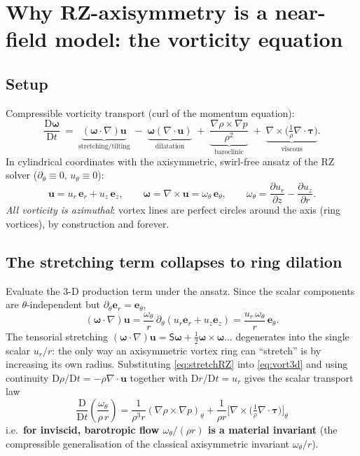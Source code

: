 \documentclass[11pt]{article}
\newcommand{\D}{\mathrm{D}}
\newcommand{\dd}{\partial}
\newcommand{\er}{\bm{e}_r}
\newcommand{\etheta}{\bm{e}_\theta}
\newcommand{\ez}{\bm{e}_z}
\newcommand{\om}{\bm{\omega}}
\newcommand{\ub}{\bm{u}}
\begin{document}
\section{Why RZ-axisymmetry is a near-field model: the vorticity equation}

\subsection{Setup}
Compressible vorticity transport (curl of the momentum equation):
\begin{equation}
  \frac{\D\om}{\D t}
  \;=\;
  \underbrace{(\om\!\cdot\!\nabla)\ub}_{\text{stretching/tilting}}
  \;-\;
  \underbrace{\om(\nabla\!\cdot\!\ub)}_{\text{dilatation}}
  \;+\;
  \underbrace{\frac{\nabla\rho\times\nabla p}{\rho^{2}}}_{\text{baroclinic}}
  \;+\;
  \underbrace{\nabla\times\!\Big(\tfrac{1}{\rho}\nabla\!\cdot\!\bm{\tau}\Big)}_{\text{viscous}} .
  \label{eq:vort3d}
\end{equation}
In cylindrical coordinates with the axisymmetric, swirl-free ansatz of
the RZ solver ($\dd_\theta \equiv 0$, $u_\theta \equiv 0$):
\begin{equation}
  \ub = u_r\,\er + u_z\,\ez,
  \qquad
  \om = \nabla\times\ub = \omega_\theta\,\etheta,
  \qquad
  \omega_\theta = \frac{\dd u_r}{\dd z}-\frac{\dd u_z}{\dd r}.
\end{equation}
\emph{All vorticity is azimuthal}: vortex lines are perfect circles
around the axis (ring vortices), by construction and forever.

\subsection{The stretching term collapses to ring dilation}
Evaluate the 3-D production term under the ansatz. Since the scalar
components are $\theta$-independent but $\dd_\theta\er=\etheta$,
\begin{equation}
  (\om\!\cdot\!\nabla)\ub
  = \frac{\omega_\theta}{r}\,\dd_\theta\!\left(u_r\er+u_z\ez\right)
  = \frac{u_r\,\omega_\theta}{r}\,\etheta .
  \label{eq:stretchRZ}
\end{equation}
The tensorial stretching $(\om\!\cdot\!\nabla)\ub = \mathsf{S}\om + \tfrac12\om\times\om\dots$
degenerates into the single scalar $u_r/r$: the only way an
axisymmetric vortex ring can ``stretch'' is by increasing its own
radius. Substituting \eqref{eq:stretchRZ} into \eqref{eq:vort3d} and
using continuity $\D\rho/\D t=-\rho\nabla\!\cdot\!\ub$ together with
$\D r/\D t = u_r$ gives the scalar transport law
\begin{equation}
  \boxed{\;
  \frac{\D}{\D t}\!\left(\frac{\omega_\theta}{\rho\, r}\right)
  = \frac{1}{\rho^{3} r}\left(\nabla\rho\times\nabla p\right)_\theta
  + \frac{1}{\rho r}\Big[\nabla\times\big(\tfrac1\rho\nabla\!\cdot\!\bm\tau\big)\Big]_\theta
  \;}
  \label{eq:invariant}
\end{equation}
i.e.\ \textbf{for inviscid, barotropic flow $\omega_\theta/(\rho r)$ is a
material invariant} (the compressible generalisation of the classical
axisymmetric invariant $\omega_\theta/r$).
\end{document}
